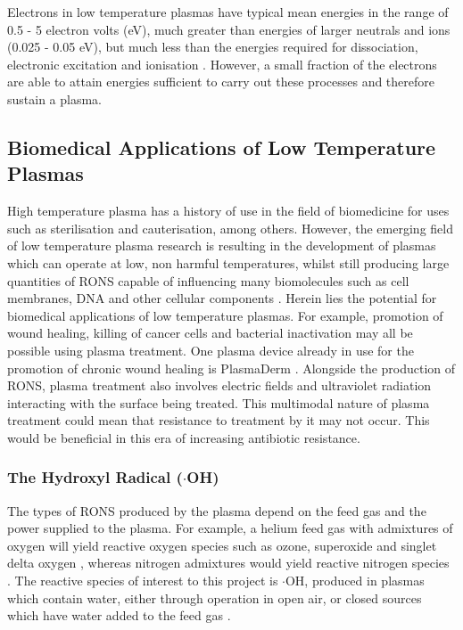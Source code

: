 \documentclass[11pt, oneside]{article}   	%
\begin{document}
Electrons in low temperature plasmas have typical mean energies in the range of 0.5 - 5 electron volts (eV), much greater than energies of larger neutrals and ions (0.025 - 0.05 eV), but much less than the energies required for dissociation, electronic excitation and ionisation \cite{Christophorou2012}.
However, a small fraction of the electrons are able to attain energies sufficient to carry out these processes and therefore sustain a plasma.

\subsection{Biomedical Applications of Low Temperature Plasmas}

High temperature plasma has a history of use in the field of biomedicine for uses such as sterilisation and cauterisation, among others.
However, the emerging field of low temperature plasma research is resulting in the development of plasmas which can operate at low, non harmful temperatures, whilst still producing large quantities of RONS capable of influencing many biomolecules such as cell membranes, DNA and other cellular components \cite{Graves2012, Hirst2015}.
Herein lies the potential for biomedical applications of low temperature plasmas.
For example, promotion of wound healing, killing of cancer cells and bacterial inactivation may all be possible using plasma treatment.
One plasma device already in use for the promotion of chronic wound healing is PlasmaDerm \cite{BrehmerHD2015}.
Alongside the production of RONS, plasma treatment also involves electric fields and ultraviolet radiation interacting with the surface being treated.
This multimodal nature of plasma treatment could mean that resistance to treatment by it may not occur. 
This would be beneficial in this era of increasing antibiotic resistance.



\subsubsection{The Hydroxyl Radical ($\cdot$OH)} \label{sec:HydroxylRadical}

The types of RONS produced by the plasma depend on the feed gas and the power supplied to the plasma.
For example, a helium feed gas with admixtures of oxygen will yield reactive oxygen species such as ozone, superoxide and singlet delta oxygen \cite{SousaNCAGO2011}, whereas nitrogen admixtures would yield reactive nitrogen species \cite{Wagenaars2012}. 
The reactive species of interest to this project is $\cdot$OH, produced in plasmas which contain water, either through operation in open air, or closed sources which have water added to the feed gas \cite{Schroter2015}.
\end{document}
